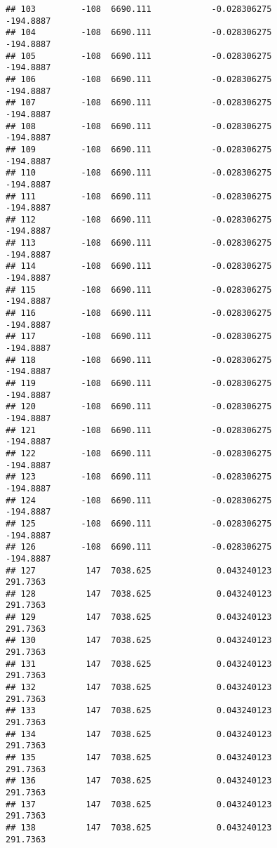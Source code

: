 \documentclass[]{article}
\begin{document}
\begin{verbatim}
## 103         -108  6690.111            -0.028306275          -194.8887
## 104         -108  6690.111            -0.028306275          -194.8887
## 105         -108  6690.111            -0.028306275          -194.8887
## 106         -108  6690.111            -0.028306275          -194.8887
## 107         -108  6690.111            -0.028306275          -194.8887
## 108         -108  6690.111            -0.028306275          -194.8887
## 109         -108  6690.111            -0.028306275          -194.8887
## 110         -108  6690.111            -0.028306275          -194.8887
## 111         -108  6690.111            -0.028306275          -194.8887
## 112         -108  6690.111            -0.028306275          -194.8887
## 113         -108  6690.111            -0.028306275          -194.8887
## 114         -108  6690.111            -0.028306275          -194.8887
## 115         -108  6690.111            -0.028306275          -194.8887
## 116         -108  6690.111            -0.028306275          -194.8887
## 117         -108  6690.111            -0.028306275          -194.8887
## 118         -108  6690.111            -0.028306275          -194.8887
## 119         -108  6690.111            -0.028306275          -194.8887
## 120         -108  6690.111            -0.028306275          -194.8887
## 121         -108  6690.111            -0.028306275          -194.8887
## 122         -108  6690.111            -0.028306275          -194.8887
## 123         -108  6690.111            -0.028306275          -194.8887
## 124         -108  6690.111            -0.028306275          -194.8887
## 125         -108  6690.111            -0.028306275          -194.8887
## 126         -108  6690.111            -0.028306275          -194.8887
## 127          147  7038.625             0.043240123           291.7363
## 128          147  7038.625             0.043240123           291.7363
## 129          147  7038.625             0.043240123           291.7363
## 130          147  7038.625             0.043240123           291.7363
## 131          147  7038.625             0.043240123           291.7363
## 132          147  7038.625             0.043240123           291.7363
## 133          147  7038.625             0.043240123           291.7363
## 134          147  7038.625             0.043240123           291.7363
## 135          147  7038.625             0.043240123           291.7363
## 136          147  7038.625             0.043240123           291.7363
## 137          147  7038.625             0.043240123           291.7363
## 138          147  7038.625             0.043240123           291.7363

\end{verbatim}
\end{document}
